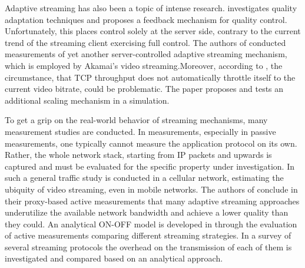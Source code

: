 Adaptive streaming has also been a topic of intense research. \cite{DeCicco:2011:FCA:1943552.1943573} investigates quality adaptation techniques and proposes a feedback mechanism for quality control. Unfortunately, this places control solely at the server side, contrary to the current trend of the streaming client exercising full control. The authors of \cite{cicco2010akamai} conducted measurements of yet another server-controlled adaptive streaming mechanism, which is employed by Akamai's video streaming.Moreover, according to \cite{5945211}, the circumstance, that \gls{TCP} throughput does not automatically throttle itself to the current video bitrate, could be problematic. The paper proposes and tests an additional scaling mechanism in a simulation.

To get a grip on the real-world behavior of streaming mechanisms, many measurement studies are conducted. In measurements, especially in passive measurements, one typically cannot measure the application protocol on its own. Rather, the whole network stack, starting from \gls{IP} packets and upwards is captured and must be evaluated for the specific property under investigation.
In \cite{Erman:2011:OTV:2068816.2068829} such a general traffic study is conducted in a cellular network, estimating the ubiquity of video streaming, even in mobile networks. The authors of \cite{Huang:2012:CTU:2398776.2398800} conclude in their proxy-based active measurements that many adaptive streaming approaches underutilize the available network bandwidth and achieve a lower quality than they could. An analytical ON-OFF model is developed in \cite{Rao:2011:NCV:2079296.2079321} through the evaluation of active measurements comparing different streaming strategies.
In a survey of several streaming protocols \cite{5703713} the overhead on the transmission of each of them is investigated and compared based on an analytical approach. 


